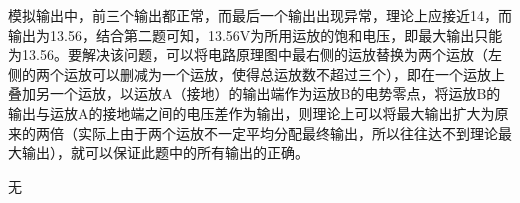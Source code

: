 \documentclass[UTF8]{ctexart}
\begin{document}
模拟输出中，前三个输出都正常，而最后一个输出出现异常，理论上应接近14，而输出为13.56，结合第二题可知，13.56V为所用运放的饱和电压，即最大输出只能为13.56。要解决该问题，可以将电路原理图中最右侧的运放替换为两个运放（左侧的两个运放可以删减为一个运放，使得总运放数不超过三个），即在一个运放上叠加另一个运放，以运放A（接地）的输出端作为运放B的电势零点，将运放B的输出与运放A的接地端之间的电压差作为输出，则理论上可以将最大输出扩大为原来的两倍（实际上由于两个运放不一定平均分配最终输出，所以往往达不到理论最大输出），就可以保证此题中的所有输出的正确。
\begin{thebibliography}{123456} 
 无
\end{thebibliography}
\end{document}
